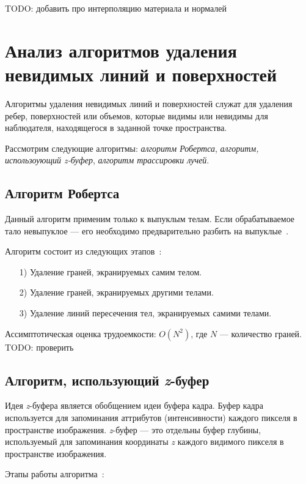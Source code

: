 	TODO: добавить про интерполяцию материала и нормалей
	
    \section{Анализ алгоритмов удаления невидимых линий и поверхностей}
    
    Алгоритмы удаления невидимых линий и поверхностей служат для удаления ребер, поверхностей или объемов, которые видимы или невидимы для наблюдателя, находящегося в заданной точке пространства\cite{rogers}.
    
    Рассмотрим следующие алгоритмы: \textit{алгоритм Робертса}, \textit{алгоритм, использоующий z-буфер}, \textit{алгоритм трассировки лучей}.
    
   \subsection{Алгоритм Робертса}
   
   Данный алгоритм применим только к выпуклым телам. Если обрабатываемое тало невыпуклое --- его необходимо предварительно разбить на выпуклые~\cite{rogers}.
   
   Алгоритм состоит из следующих этапов~\cite{rogers}:
   \begin{enumerate}
   	\item[1)] Удаление граней, экранируемых самим телом.
   	\item[2)] Удаление граней, экранируемых другими телами.
   	\item[3)] Удаление линий пересечения тел, экранируемых самими телами.
   \end{enumerate}
   
   Ассимптотическая оценка трудоемкости: $O(N^2)$, где $N$ --- количество граней. TODO: проверить
   
   \subsection{Алгоритм, использующий \textit{z}-буфер}
   
   Идея \textit{z}-буфера является обобщением идеи буфера кадра. Буфер кадра используется для запоминания аттрибутов (интенсивности) каждого пикселя в пространстве изображения. \textit{z}-буфер --- это отдельны буфер глубины, используемый для запоминания координаты \textit{z} каждого видимого пикселя в пространстве изображения\cite{rogers}.
   
   Этапы работы алгоритма~\cite{rogers}:
   
